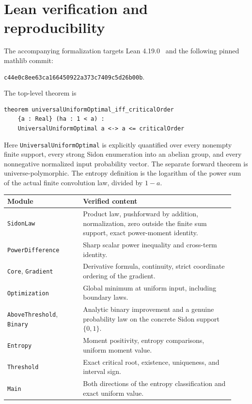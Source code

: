 \documentclass[11pt,a4paper]{article}
\newcommand{\code}[1]{\texttt{\small #1}}
\begin{document}
\section{Lean verification and reproducibility}

The accompanying formalization targets Lean 4.19.0~\cite{Lean} and the following
pinned mathlib commit:
\begin{center}
\code{c44e0c8ee63ca166450922a373c7409c5d26b00b}.
\end{center}
The top-level theorem is
\begin{verbatim}
theorem universalUniformOptimal_iff_criticalOrder
    {a : Real} (ha : 1 < a) :
    UniversalUniformOptimal a <-> a <= criticalOrder
\end{verbatim}
Here \code{UniversalUniformOptimal} is explicitly quantified over every
nonempty finite support, every strong Sidon enumeration into an abelian
group, and every nonnegative normalized input probability
vector. The separate forward theorem is universe-polymorphic.
The entropy definition is the logarithm of the power sum of the actual
finite convolution law, divided by $1-a$.

\begin{center}
\begin{tabular}{@{}p{0.31\linewidth}p{0.62\linewidth}@{}}
\toprule
Module & Verified content\\
\midrule
\code{SidonLaw} & Product law, pushforward by addition, normalization,
zero outside the finite sum support, exact power-moment identity.\\
\code{PowerDifference} & Sharp scalar power inequality and cross-term identity.\\
\code{Core}, \code{Gradient} & Derivative formula, continuity, strict coordinate
ordering of the gradient.\\
\code{Optimization} & Global minimum at uniform input, including boundary laws.\\
\code{AboveThreshold}, \code{Binary} & Analytic binary improvement and a genuine
probability law on the concrete Sidon support $\{0,1\}$.\\
\code{Entropy} & Moment positivity, entropy comparisons, uniform moment value.\\
\code{Threshold} & Exact critical root, existence, uniqueness, and interval sign.\\
\code{Main} & Both directions of the entropy classification and exact uniform value.\\
\bottomrule
\end{tabular}
\end{center}
\end{document}
